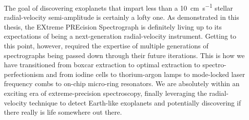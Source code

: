 The goal of discovering exoplanets that impart less than a 10~\si{\centi\meter\per\second} stellar radial-velocity semi-amplitude is certainly a lofty one. As demonstrated in this thesis, the EXtreme PREcision Spectrograph is definitely living up to its expectations of being a next-generation radial-velocity instrument. Getting to this point, however, required the expertise of multiple generations of spectrographs being passed down through their future iterations. This is how we have transitioned from boxcar extraction to optimal extraction to spectro-perfectionism and from iodine cells to thorium-argon lamps to mode-locked laser frequency combs to on-chip micro-ring resonators. We are absolutely within an exciting era of extreme-precision spectroscopy, finally leveraging the radial-velocity technique to detect Earth-like exoplanets and potentially discovering if there really is life somewhere out there.